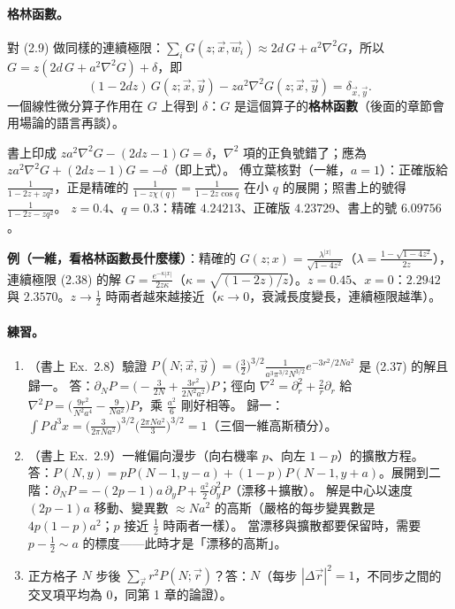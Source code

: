 \paragraph{格林函數。}
對 (2.9) 做同樣的連續極限：$\sum_iG(z;\vec x,\vec w_i)\approx2d\,G+a^2\nabla^2G$，所以 $G=z(2d\,G+a^2\nabla^2G)+\delta$，即
\[(1-2dz)\,G(z;\vec x,\vec y)-za^2\nabla^2G(z;\vec x,\vec y)=\delta_{\vec x,\vec y}.\tag{2.38}\]
一個線性微分算子作用在 $G$ 上得到 $\delta$：$G$ 是這個算子的\textbf{格林函數}（後面的章節會用場論的語言再談）。
\begin{errbox}[p.~40，(2.38)]
書上印成 $za^2\nabla^2G-(2dz-1)G=\delta$，$\nabla^2$ 項的正負號錯了；應為 $za^2\nabla^2G+(2dz-1)G=-\delta$（即上式）。
傅立葉核對（一維，$a=1$）：正確版給 $\frac1{1-2z+zq^2}$，正是精確的 $\frac1{1-z\chi(q)}=\frac1{1-2z\cos q}$ 在小 $q$ 的展開；照書上的號得 $\frac1{1-2z-zq^2}$。
$z=0.4$、$q=0.3$：精確 $4.24213$、正確版 $4.23729$、書上的號 $6.09756$。
\end{errbox}
\textbf{例（一維，看格林函數長什麼樣）}：精確的 $G(z;x)=\frac{\lambda^{|x|}}{\sqrt{1-4z^2}}$（$\lambda=\frac{1-\sqrt{1-4z^2}}{2z}$），連續極限 (2.38) 的解
$G=\frac{e^{-\kappa|x|}}{2z\kappa}$（$\kappa=\sqrt{(1-2z)/z}$）。$z=0.45$、$x=0$：$2.2942$ 與 $2.3570$。$z\to\frac12$ 時兩者越來越接近（$\kappa\to0$，衰減長度變長，連續極限越準）。

\paragraph{練習。}
\begin{enumerate}
\item（書上 Ex.~2.8）驗證 $P(N;\vec x,\vec y)=\big(\frac32\big)^{3/2}\frac{1}{a^3\pi^{3/2}N^{3/2}}e^{-3r^2/2Na^2}$ 是 (2.37) 的解且歸一。\quad
答：$\partial_NP=\big(-\frac3{2N}+\frac{3r^2}{2N^2a^2}\big)P$；徑向 $\nabla^2=\partial_r^2+\frac2r\partial_r$ 給 $\nabla^2P=\big(\frac{9r^2}{N^2a^4}-\frac9{Na^2}\big)P$，乘 $\frac{a^2}6$ 剛好相等。
歸一：$\int P\,d^3x=\big(\frac{3}{2\pi Na^2}\big)^{3/2}\big(\frac{2\pi Na^2}3\big)^{3/2}=1$（三個一維高斯積分）。
\item（書上 Ex.~2.9）一維偏向漫步（向右機率 $p$、向左 $1-p$）的擴散方程。\quad
答：$P(N,y)=pP(N-1,y-a)+(1-p)P(N-1,y+a)$。展開到二階：$\partial_NP=-(2p-1)a\,\partial_yP+\frac{a^2}2\partial_y^2P$（漂移＋擴散）。
解是中心以速度 $(2p-1)a$ 移動、變異數 $\approx Na^2$ 的高斯（嚴格的每步變異數是 $4p(1-p)a^2$；$p$ 接近 $\frac12$ 時兩者一樣）。
當漂移與擴散都要保留時，需要 $p-\frac12\sim a$ 的標度——此時才是「漂移的高斯」。
\item 正方格子 $N$ 步後 $\sum_{\vec r}r^2P(N;\vec r)$？\quad 答：$N$（每步 $|\Delta\vec r|^2=1$，不同步之間的交叉項平均為 0，同第 1 章的論證）。
\end{enumerate}

